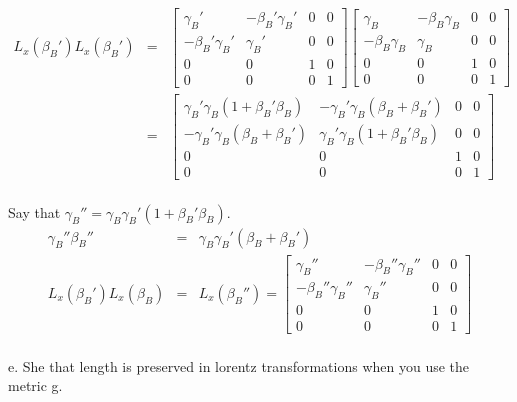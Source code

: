 \documentclass[11pt]{amsart}
\begin{document}
\begin{eqnarray*}
L_{x}(\beta_{B}')L_{x}(\beta_{B}') &=& \begin{bmatrix}
	\gamma_{B}' & -\beta_{B}'\gamma_{B}' & 0 & 0 \\
	-\beta_{B}'\gamma_{B}' & \gamma_{B}' & 0 & 0 \\
	0 & 0 & 1 & 0 \\
	0 & 0 & 0 & 1 
	\end{bmatrix}\begin{bmatrix}
	\gamma_{B} & -\beta_{B}\gamma_{B} & 0 & 0 \\
	-\beta_{B}\gamma_{B} & \gamma_{B} & 0 & 0 \\
	0 & 0 & 1 & 0 \\
	0 & 0 & 0 & 1 
	\end{bmatrix} \\
&=& \begin{bmatrix}
	\gamma_{B}'\gamma_{B}(1+\beta_{B}'\beta_{B}) & -\gamma_{B}'\gamma_{B}(\beta_{B}+\beta_{B}') & 0 & 0 \\
	 -\gamma_{B}'\gamma_{B}(\beta_{B}+\beta_{B}') & \gamma_{B}'\gamma_{B}(1+\beta_{B}'\beta_{B}) & 0 & 0 \\
	0 & 0 & 1 & 0 \\
	0 & 0 & 0 & 1 
	\end{bmatrix} 
\end{eqnarray*} \\
Say that $\gamma_{B}''=\gamma_{B}\gamma_{B}'(1+\beta_{B}'\beta_{B})$. \\
\begin{eqnarray*} 
\gamma_{B}''\beta_{B}'' &=& \gamma_{B}\gamma_{B}'(\beta_{B}+\beta_{B}') \\
L_{x}(\beta_{B}')L_{x}(\beta_{B}) &=& L_{x}(\beta_{B}'') = \begin{bmatrix}
	\gamma_{B}'' & -\beta_{B}''\gamma_{B}'' & 0 & 0 \\
	-\beta_{B}''\gamma_{B}'' & \gamma_{B}'' & 0 & 0 \\
	0 & 0 & 1 & 0 \\
	0 & 0 & 0 & 1
	\end{bmatrix} 
\end{eqnarray*} \\
e. She that length is preserved in lorentz transformations when you use the metric g. \\
\end{document}
